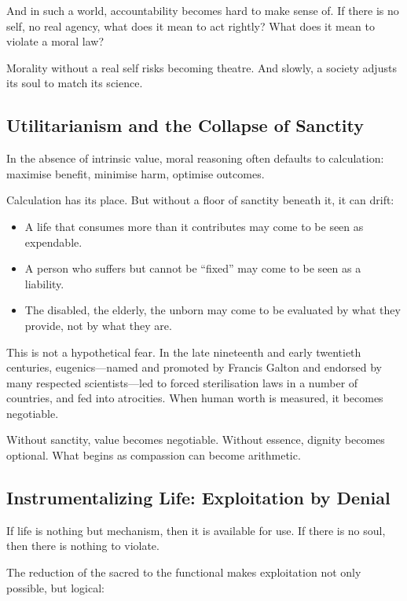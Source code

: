 \documentclass[11pt,a4paper]{article}
\begin{document}
And in such a world, accountability becomes hard to make sense of. If there is no self, no real agency, what does it mean to act rightly? What does it mean to violate a moral law?

Morality without a real self risks becoming theatre. And slowly, a society adjusts its soul to match its science.

\subsection{Utilitarianism and the Collapse of Sanctity}

In the absence of intrinsic value, moral reasoning often defaults to calculation: maximise benefit, minimise harm, optimise outcomes.

Calculation has its place. But without a floor of sanctity beneath it, it can drift:

\begin{itemize}
  \item A life that consumes more than it contributes may come to be seen as expendable.
  \item A person who suffers but cannot be ``fixed'' may come to be seen as a liability.
  \item The disabled, the elderly, the unborn may come to be evaluated by what they provide, not by what they are.
\end{itemize}

This is not a hypothetical fear. In the late nineteenth and early twentieth centuries, eugenics---named and promoted by Francis Galton and endorsed by many respected scientists---led to forced sterilisation laws in a number of countries, and fed into atrocities. When human worth is measured, it becomes negotiable.

Without sanctity, value becomes negotiable. Without essence, dignity becomes optional. What begins as compassion can become arithmetic.

\subsection{Instrumentalizing Life: Exploitation by Denial}

If life is nothing but mechanism, then it is available for use. If there is no soul, then there is nothing to violate.

The reduction of the sacred to the functional makes exploitation not only possible, but logical:
\end{document}
